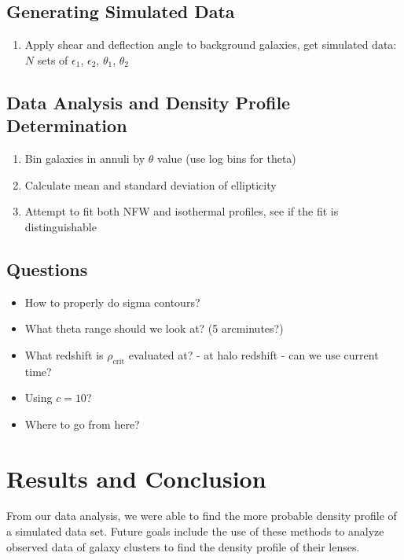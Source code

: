 \documentclass[10pt]{article}
\begin{document}
\subsection{Generating Simulated Data}
\begin{enumerate}
\item Apply shear and deflection angle to background galaxies, get simulated data: $N$ sets of $\epsilon_1$, $\epsilon_2$, $\theta_1$, $\theta_2$
\end{enumerate}

\subsection{Data Analysis and Density Profile Determination}
\begin{enumerate}
\item Bin galaxies in annuli by $\theta$ value (use log bins for theta)
\item Calculate mean and standard deviation of ellipticity
\item Attempt to fit both NFW and isothermal profiles, see if the fit is distinguishable
\end{enumerate}


\subsection{Questions}
\begin{itemize}
    \item How to properly do sigma contours?
    \item What theta range should we look at? (5 arcminutes?)
    \item What redshift is $\rho_\mathrm{crit}$ evaluated at? - at halo redshift - can we use current time?
    \item Using $c = 10$?
    \item Where to go from here?
\end{itemize}


\section{Results and Conclusion}

From our data analysis, we were able to find the more probable density profile of a simulated data set.
Future goals include the use of these methods to analyze observed data of galaxy clusters to find the density profile of their lenses.



\end{document}
